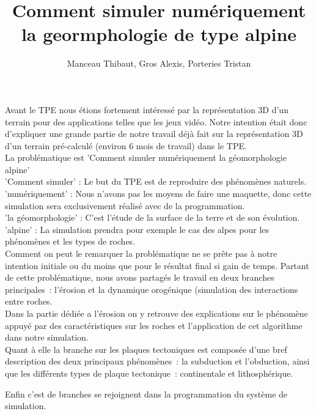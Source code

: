 \documentclass[a4paper,10pt]{article}
\title{Comment simuler numériquement la geormphologie de type alpine}
\author{Manceau Thibaut, Gros Alexis, Porteries Tristan}
\begin{document}
\maketitle

\begin{abstract}

\end{abstract}


Avant le TPE nous étions fortement intéressé par la représentation 3D d'un terrain pour des applications telles que les jeux vidéo. Notre intention était donc d'expliquer une grande partie de notre travail déjà fait sur la représentation 3D d'un terrain pré-calculé (environ 6 mois de travail) dans le TPE. \\

La problématique est 'Comment simuler numériquement la géomorphologie alpine' \\ 
'Comment simuler' : Le but du TPE est de reproduire des phénomènes naturels. \\
'numériquement' : Nous n'avons pas les moyens de faire une maquette, donc cette simulation sera  exclusivement réalisé avec de la programmation. \\
'la géomorphologie' : C'est l'étude de la surface de la terre et de son évolution. \\
'alpine' : La simulation prendra pour exemple le cas des alpes pour les phénomènes et les types de roches. \\

Comment on peut le remarquer la problématique ne se prête pas à notre intention initiale ou du moins que pour le résultat final si gain de temps. Partant de cette problématique, nous avons partagés le travail en deux branches principales~: l'érosion et la dynamique orogénique (simulation des interactions entre roches. \\

Dans la partie dédiée a l'érosion on y retrouve des explications sur le phénomène appuyé par des caractéristiques sur les roches et l'application de cet algorithme dans notre simulation. \\

Quant à elle la branche sur les plaques tectoniques est composée d'une bref description des deux principaux phénomènes~: la subduction et l'obduction, ainsi que les différents types de plaque tectonique~: continentale et lithosphérique.

Enfin c'est de branches se rejoignent dans la programmation du système de simulation. \\
\end{document}
